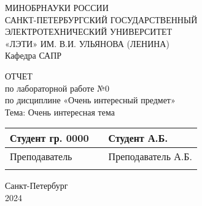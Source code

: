 \clearpage
\begin{center}	
	МИНОБРНАУКИ РОССИИ\\
	САНКТ-ПЕТЕРБУРГСКИЙ ГОСУДАРСТВЕННЫЙ\\
	ЭЛЕКТРОТЕХНИЧЕСКИЙ УНИВЕРСИТЕТ\\
	«ЛЭТИ» ИМ. В.И. УЛЬЯНОВА (ЛЕНИНА)\\
	Кафедра САПР

	\vspace{54mm}

	ОТЧЕТ\\
	по лабораторной работе №0 \\
	по дисциплине «Очень интересный предмет» \\
	Тема: Очень интересная тема

	\vspace{65mm}

	\def\arraystretch{1.5}
	\begin{tabularx}{\textwidth}{ >{\hsize=7cm}X >{\hsize=4cm}X  >{\centering\arraybackslash}X }
		Студент гр. 0000 & & Студент А.Б. \\ \cline{2-2}
		Преподаватель & & Преподаватель А.Б. \\ \cline{2-2}
	\end{tabularx}
	\def\arraystretch{1}

	\vfill
	Санкт-Петербург\\
	2024
\end{center}
\newpage
{}
\setcounter{page}{2}